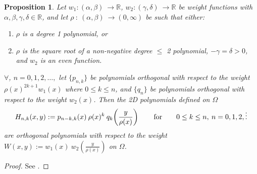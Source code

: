 \documentclass[11pt, oneside]{article}   	%
\newcommand{\R}{\mathbb{R}}
\newcommand{\hdop}{H}
\newcommand{\hdopnk}{\hdop_{n,k}}
\newtheorem{proposition}{Proposition}
\begin{document}
\begin{proposition}\label{prop:construction}
Let \(w_1 : (\alpha,\beta) \: \to \R\), \(w_2 : (\gamma,\delta) \: \to \R\) be weight functions with \(\alpha,\beta,\gamma,\delta \in \R\), and let \(\rho \: : \: (\alpha,\beta) \: \to (0,\infty)\) be such that either:
\begin{enumerate}
\item  \(\rho\) is a degree 1 polynomial, or 
\item \(\rho\) is the square root of a non-negative degree \(\le\) 2 polynomial, \(-\gamma = \delta > 0\), and \(w_2\) is an even function.
\end{enumerate}
$\forall$, $n = 0,1,2,\dots, $ let $\{p_{n,k}\}$ be polynomials orthogonal with respect to the weight $\rho(x)^{2k+1} w_1(x)$ where $0 \le k \le n$, and $\{q_{n}\}$ be polynomials orthogonal with respect to the weight $w_2(x)$. Then the 2D polynomials defined on $\Omega$
$$
\hdopnk(x,y) := p_{n-k,k}(x) \: \rho(x)^k \: q_k\fpr(\frac{y}{\rho(x)}) \qquad\hbox{for} \qquad 0 \le k \le n, \: n = 0,1,2,\dots
$$
are orthogonal polynomials with respect to the weight \(W(x,y) := w_1(x) \: w_2(\frac{y}{\rho(x)}) \) on $\Omega$. 
\end{proposition}
\begin{proof}
See \cite[p55--56]{dunkl2014orthogonal}.
\end{proof}
\end{document}
